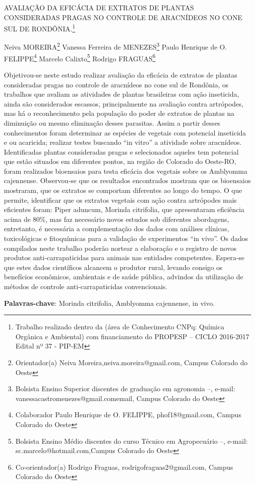 \documentclass[article,12pt,onesidea,4paper,english,brazil]{abntex2}
\begin{document}
	
	
	\frenchspacing 
	
	\begin{center}
		\LARGE AVALIAÇÃO DA EFICÁCIA DE EXTRATOS DE PLANTAS CONSIDERADAS
		PRAGAS NO CONTROLE DE ARACNÍDEOS NO CONE SUL DE RONDÔNIA.\footnote{Trabalho realizado dentro da (área de Conhecimento CNPq: Química Orgânica e Ambiental) com
			financiamento do PROPESP – CICLO 2016-2017 Edital nº 37 - PIP-EM}
		
		\normalsize
	Neiva MOREIRA\footnote{Orientador(a) Neiva Moreira,neiva.moreira@gmail.com, Campus Colorado do Oeste} 
		Vanessa Ferreira de MENEZES\footnote{Bolsista Ensino Superior discentes de graduação em agronomia –, e-mail:
			vanessacastromenezes@gmail.comemail, Campus Colorado do Oeste} 
		Paulo Henrique de O. FELIPPE\footnote{Colaborador Paulo Henrique de O. FELIPPE, phof18@gmail.com, Campus Colorado do Oeste} 
	Marcelo
	Calixto\footnote{Bolsista Ensino Médio discentes do curso Técnico em Agropecuário –, e-mail:
		sc.marcelo@hotmail.com,Campus Colorado do Oeste}
		Rodrigo FRAGUAS\footnote{Co-orientador(a) Rodrigo Fraguas, rodrigofraguas2@gmail.com, Campus Colorado do Oeste} 
	\end{center}
	
	\noindent Objetivou-se neste estudo realizar avaliação da eficácia de extratos de
	plantas consideradas pragas no controle de aracnídeos no cone sul de Rondônia, os
	trabalhos que avaliam as atividades de plantas brasileiras com ação inseticida, ainda
	são considerados escassos, principalmente na avaliação contra artrópodes, mas há
	o reconhecimento pela população do poder de extratos de plantas na diminuição ou
	mesmo eliminação desses parasitas. Assim a partir desses conhecimentos foram
	determinar as espécies de vegetais com potencial inseticida e ou acaricida; realizar
	testes buscando “in vitro” a atividade sobre aracnídeos. Identificadas plantas
	consideradas pragas e selecionados aqueles tem potencial que estão situados em
	diferentes pontos, na região de Colorado do Oeste-RO, foram realizados bioensaios
	para testa eficácia dos vegetais sobre os Amblyomma cajennense. Observou-se que
	os resultados encontrados mostram que os bioensaios mostraram, que os extratos
	se comportam diferentes ao longo do tempo. O que permite, identificar que os
	extratos vegetais com ação contra artrópodes mais eficientes foram: Piper aduncum,
	Morinda citrifolia, que apresentaram eficiência acima de 80\%, mas faz necessário
	novos estudos sob diferentes abordagens, entretanto, é necessária a
	complementação dos dados com análises clínicas, toxicológicas e fitoquímicas para
	a validação de experimentos “in vivo”. Os dados compilados neste trabalho poderão
	nortear a elaboração e o registro de novos produtos anti-carrapaticidas para animais
	nas entidades competentes. Espera-se que estes dados científicos alcancem o
	produtor rural, levando consigo os benefícios econômicos, ambientais e de saúde
	pública, advindos da utilização de métodos de controle anti-carrapaticidas
	convencionais.
	
	\vspace{\onelineskip}
	
	\noindent
	\textbf{Palavras-chave}: Morinda citrifolia, Amblyomma cajennense, in vivo.
	
\end{document}
